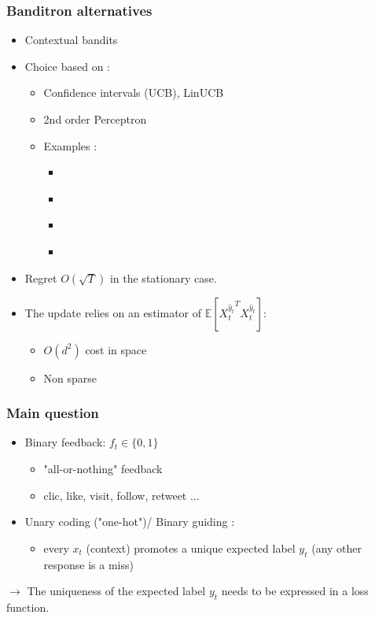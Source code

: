 \documentclass{beamer}
\begin{document}
\begin{frame}\frametitle{Banditron alternatives}
	\begin{itemize}
		\item Contextual bandits
		\item Choice based on :
		\begin{itemize}
			\item Confidence intervals (UCB)\cite{lai1985asymptotically}, LinUCB \cite{auer2002using}
			\item 2nd order Perceptron \cite{cesa2005second}
			\item Examples :
			\begin{itemize}
				\item\cite{li2010contextual}
				\item\cite{hazan2011newtron}
				\item\cite{crammer2013multiclass}
				\item\cite{ngo2013upper}
			\end{itemize}
		\end{itemize} 
		\item Regret $O(\sqrt{T})$ in the stationary case.
		\item The update relies on an estimator of
		$\mathbb{E}\left[ {X_t^{\hat{y}_t}}^T X_t^{\hat{y}_t}\right]$:
		\begin{itemize}
			\item  $O(d^2)$ cost in space
			\item Non sparse
		\end{itemize}
	\end{itemize}
	
\end{frame}


\begin{frame}\frametitle{Main question}
	\begin{itemize}
		\item Binary feedback: $f_t \in \{0,1\}$
		\begin{itemize}
			\item "all-or-nothing" feedback
			\item clic, like, visit, follow, retweet ...
		\end{itemize}
		\item Unary coding ("one-hot")/ Binary guiding : 
		\begin{itemize}
			\item every $x_t$ (context) promotes a unique expected label $y_t$
			(any other response is a miss)
		\end{itemize}
	\end{itemize}
	$\rightarrow$ The uniqueness of the expected label $y_t$ needs to be expressed in a loss function.
\end{frame}
\end{document}
